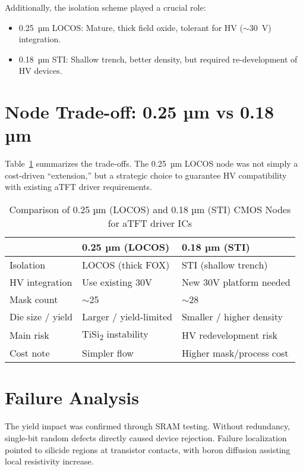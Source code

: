 \documentclass[conference]{IEEEtran}
\begin{document}
Additionally, the isolation scheme played a crucial role:
\begin{itemize}
  \item 0.25~µm LOCOS: Mature, thick field oxide, tolerant for HV ($\sim$30~V) integration.
  \item 0.18~µm STI: Shallow trench, better density, but required re-development of HV devices.
\end{itemize}

\section{Node Trade-off: 0.25 µm vs 0.18 µm}
Table~\ref{tab:node} summarizes the trade-offs.  
The 0.25~µm LOCOS node was not simply a cost-driven ``extension,'' but a strategic choice to guarantee HV compatibility with existing aTFT driver requirements.

\begin{table}[!t]
\caption{Comparison of 0.25 µm (LOCOS) and 0.18 µm (STI) CMOS Nodes for aTFT driver ICs}
\label{tab:node}
\centering
\begin{tabular}{@{}lll@{}}
\toprule
 & \textbf{0.25 µm (LOCOS)} & \textbf{0.18 µm (STI)} \\
\midrule
Isolation & LOCOS (thick FOX) & STI (shallow trench) \\
HV integration & Use existing 30V & New 30V platform needed \\
Mask count & $\sim$25 & $\sim$28 \\
Die size / yield & Larger / yield-limited & Smaller / higher density \\
Main risk & TiSi\textsubscript{2} instability & HV redevelopment risk \\
Cost note & Simpler flow & Higher mask/process cost \\
\bottomrule
\end{tabular}
\end{table}

\section{Failure Analysis}
The yield impact was confirmed through SRAM testing.  
Without redundancy, single-bit random defects directly caused device rejection.  
Failure localization pointed to silicide regions at transistor contacts, with boron diffusion assisting local resistivity increase.
\end{document}
